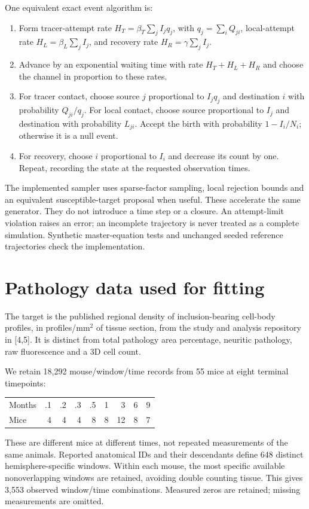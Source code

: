 \documentclass[10pt]{article}
\begin{document}
One equivalent exact event algorithm is:
\begin{enumerate}
\item Form tracer-attempt rate $H_T=\beta_T\sum_j I_j q_j$, with $q_j=\sum_iQ_{ji}$, local-attempt rate $H_L=\beta_L\sum_jI_j$, and recovery rate $H_R=\gamma\sum_jI_j$.
\item Advance by an exponential waiting time with rate $H_T+H_L+H_R$ and choose the channel in proportion to these rates.
\item For tracer contact, choose source $j$ proportional to $I_jq_j$ and destination $i$ with probability $Q_{ji}/q_j$. For local contact, choose source proportional to $I_j$ and destination with probability $L_{ji}$. Accept the birth with probability $1-I_i/N_i$; otherwise it is a null event.
\item For recovery, choose $i$ proportional to $I_i$ and decrease its count by one. Repeat, recording the state at the requested observation times.
\end{enumerate}
The implemented sampler uses sparse-factor sampling, local rejection bounds and an equivalent susceptible-target proposal when useful. These accelerate the same generator. They do not introduce a time step or a closure. An attempt-limit violation raises an error; an incomplete trajectory is never treated as a complete simulation. Synthetic master-equation tests and unchanged seeded reference trajectories check the implementation.

\section{Pathology data used for fitting}
The target is the published regional density of inclusion-bearing cell-body profiles, in profiles/mm$^2$ of tissue section, from the study and analysis repository in [4,5]. It is distinct from total pathology area percentage, neuritic pathology, raw fluorescence and a 3D cell count.

We retain 18,292 mouse/window/time records from 55 mice at eight terminal timepoints:
\begin{center}
\begin{tabular}{lrrrrrrrr}\toprule
Months & .1 & .2 & .3 & .5 & 1 & 3 & 6 & 9\\
Mice & 4 & 4 & 4 & 8 & 8 & 12 & 8 & 7\\\bottomrule
\end{tabular}
\end{center}
These are different mice at different times, not repeated measurements of the same animals. Reported anatomical IDs and their descendants define 648 distinct hemisphere-specific windows. Within each mouse, the most specific available nonoverlapping windows are retained, avoiding double counting tissue. This gives 3,553 observed window/time combinations. Measured zeros are retained; missing measurements are omitted.
\end{document}
